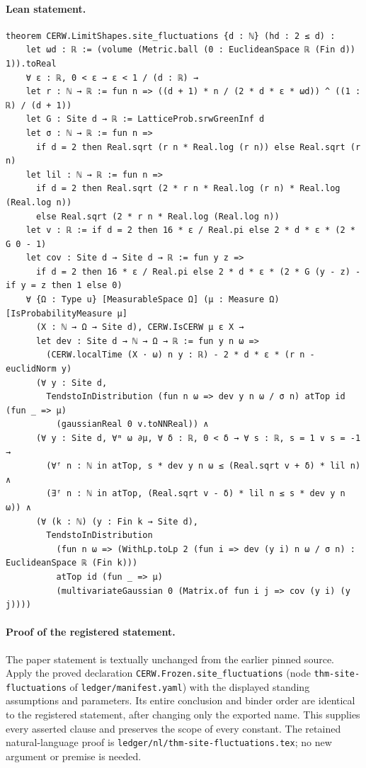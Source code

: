 \paragraph{Lean statement.}
\begin{verbatim}
theorem CERW.LimitShapes.site_fluctuations {d : ℕ} (hd : 2 ≤ d) :
    let ωd : ℝ := (volume (Metric.ball (0 : EuclideanSpace ℝ (Fin d)) 1)).toReal
    ∀ ε : ℝ, 0 < ε → ε < 1 / (d : ℝ) →
    let r : ℕ → ℝ := fun n => ((d + 1) * n / (2 * d * ε * ωd)) ^ ((1 : ℝ) / (d + 1))
    let G : Site d → ℝ := LatticeProb.srwGreenInf d
    let σ : ℕ → ℝ := fun n =>
      if d = 2 then Real.sqrt (r n * Real.log (r n)) else Real.sqrt (r n)
    let lil : ℕ → ℝ := fun n =>
      if d = 2 then Real.sqrt (2 * r n * Real.log (r n) * Real.log (Real.log n))
      else Real.sqrt (2 * r n * Real.log (Real.log n))
    let v : ℝ := if d = 2 then 16 * ε / Real.pi else 2 * d * ε * (2 * G 0 - 1)
    let cov : Site d → Site d → ℝ := fun y z =>
      if d = 2 then 16 * ε / Real.pi else 2 * d * ε * (2 * G (y - z) - if y = z then 1 else 0)
    ∀ {Ω : Type u} [MeasurableSpace Ω] (μ : Measure Ω) [IsProbabilityMeasure μ]
      (X : ℕ → Ω → Site d), CERW.IsCERW μ ε X →
      let dev : Site d → ℕ → Ω → ℝ := fun y n ω =>
        (CERW.localTime (X · ω) n y : ℝ) - 2 * d * ε * (r n - euclidNorm y)
      (∀ y : Site d,
        TendstoInDistribution (fun n ω => dev y n ω / σ n) atTop id (fun _ => μ)
          (gaussianReal 0 v.toNNReal)) ∧
      (∀ y : Site d, ∀ᵐ ω ∂μ, ∀ δ : ℝ, 0 < δ → ∀ s : ℝ, s = 1 ∨ s = -1 →
        (∀ᶠ n : ℕ in atTop, s * dev y n ω ≤ (Real.sqrt v + δ) * lil n) ∧
        (∃ᶠ n : ℕ in atTop, (Real.sqrt v - δ) * lil n ≤ s * dev y n ω)) ∧
      (∀ (k : ℕ) (y : Fin k → Site d),
        TendstoInDistribution
          (fun n ω => (WithLp.toLp 2 (fun i => dev (y i) n ω / σ n) : EuclideanSpace ℝ (Fin k)))
          atTop id (fun _ => μ)
          (multivariateGaussian 0 (Matrix.of fun i j => cov (y i) (y j))))
\end{verbatim}
\paragraph{Proof of the registered statement.}
The paper statement is textually unchanged from the earlier pinned source.
Apply the proved declaration \texttt{CERW.Frozen.site\_fluctuations}
(node \texttt{thm-site-fluctuations} of \texttt{ledger/manifest.yaml}) with the displayed
standing assumptions and parameters. Its entire conclusion and binder order
are identical to the registered statement, after changing only the exported
name. This supplies every asserted clause and preserves the scope of every
constant. The retained natural-language proof is
\texttt{ledger/nl/thm-site-fluctuations.tex}; no new argument or premise is needed.
